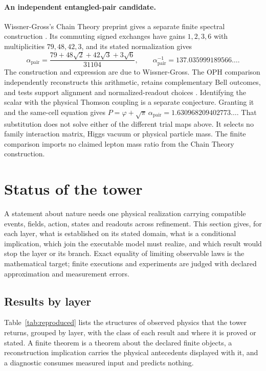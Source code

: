 \documentclass[11pt]{article}
\theoremstyle{definition}
\theoremstyle{remark}
\begin{document}
\paragraph{An independent entangled-pair candidate.}
Wissner-Gross's Chain Theory preprint gives a separate finite spectral
construction \cite{wissnergross2026pairs}. Its commuting signed exchanges
have gains $1,2,3,6$ with multiplicities $79,48,42,3$, and its stated
normalization gives
\[
 \alpha_{\mathrm{pair}}=
 \frac{79+48\sqrt2+42\sqrt3+3\sqrt6}{31104},\qquad
 \alpha_{\mathrm{pair}}^{-1}=137.035999189566\ldots.
\]
The construction and expression are due to Wissner-Gross. The OPH comparison
independently reconstructs this arithmetic, retains complementary Bell
outcomes, and tests support alignment and normalized-readout choices
\cite{ophalpha}. Identifying the scalar with the physical Thomson coupling
is a separate conjecture. Granting it and the same-cell equation gives
$P=\varphi+\sqrt\pi\,\alpha_{\mathrm{pair}}
 =1.630968209402773\ldots$.
That substitution does not solve either of the different trial maps above.
It selects no family interaction matrix, Higgs vacuum or physical particle
mass. The finite comparison imports no claimed lepton mass ratio from the
Chain Theory construction.

\section{Status of the tower}
\label{sec:scoreboard}

A statement about nature needs one physical realization carrying compatible
events, fields, action, states and readouts across refinement. This section
gives, for each layer, what is established on its stated domain, what is a
conditional implication, which join the executable model must realize, and
which result would stop the layer or its branch. Exact equality of limiting
observable laws is the mathematical target; finite executions and
experiments are judged with declared approximation and measurement errors.

\subsection{Results by layer}

Table~\ref{tab:reproduced} lists the structures of observed physics that the
tower returns, grouped by layer, with the class of each result and where it
is proved or stated. A finite theorem is a theorem about the declared finite
objects, a reconstruction implication carries the physical antecedents
displayed with it, and a diagnostic consumes measured input and predicts
nothing.
\end{document}
